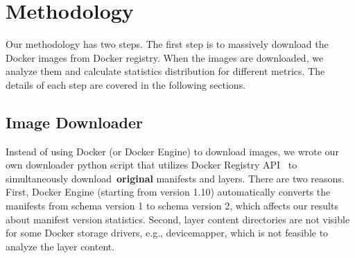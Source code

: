 
\section{Methodology}

Our methodology has two steps.
%
The first step is to massively download the Docker images from Docker registry.
%
When the images are downloaded, we analyze them and calculate statistics distribution for different metrics.
%
The details of each step are covered in the following sections.
%




\subsection{Image Downloader}

Instead of using Docker (or Docker Engine) to download images, we wrote our own downloader python script that utilizes Docker Registry API~\cite{} to simultaneously download~\textbf{original} manifests and layers.
%
%
There are two reasons.
%
First, Docker Engine (starting from version 1.10) automatically converts the manifests from schema version 1 to schema version 2, which affects our results about manifest version statistics.
%
Second, layer content directories are not visible for some Docker storage drivers, e.g., devicemapper, which is not feasible to analyze the layer content. 
%




